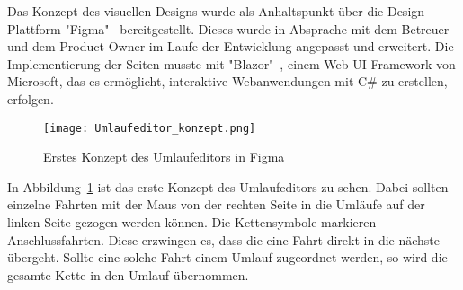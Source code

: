     Das Konzept des visuellen Designs wurde als Anhaltspunkt über die Design-Plattform "Figma"~\cite{figma} bereitgestellt. Dieses wurde in Absprache mit dem Betreuer und dem 
    Product Owner im Laufe der Entwicklung
    angepasst und erweitert. Die Implementierung der Seiten musste mit "Blazor"~\cite{blazor}, einem Web-UI-Framework von Microsoft, das es ermöglicht, interaktive Webanwendungen mit C\# zu erstellen, erfolgen.
    
    \begin{figure}[H]
        \centering
        \texttt{[image: Umlaufeditor\_konzept.png]}
        \caption{Erstes Konzept des Umlaufeditors in Figma}
        \label{fig:Umlaufeditor_konzept}
    \end{figure}

    In Abbildung~\ref{fig:Umlaufeditor_konzept} ist das erste Konzept des Umlaufeditors zu sehen. Dabei sollten einzelne Fahrten mit der Maus von der rechten Seite in die Umläufe auf der linken Seite
    gezogen werden können. Die Kettensymbole markieren Anschlussfahrten. Diese erzwingen es, dass die eine Fahrt direkt in die nächste übergeht. Sollte eine solche 
    Fahrt einem Umlauf zugeordnet werden, so wird die gesamte Kette in den Umlauf übernommen.
